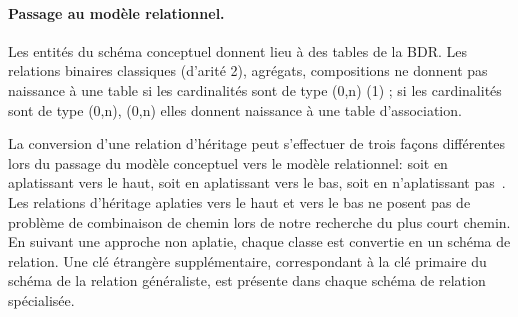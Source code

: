 \paragraph*{Passage au modèle relationnel.}
Les entités du schéma conceptuel donnent lieu à des tables de la BDR.
Les relations binaires classiques (d'arité 2), agrégats, compositions ne donnent pas naissance à une table si les cardinalités sont de type (0,n) (1) ; si les cardinalités sont de type (0,n), (0,n) elles donnent naissance à une table d'association.

La conversion d'une relation d'héritage peut s'effectuer de trois façons différentes lors du passage du modèle conceptuel vers le modèle relationnel: soit en aplatissant vers le haut, soit en aplatissant vers le bas, soit en n'aplatissant pas~\cite{elmasri_2006}. Les relations d'héritage aplaties vers le haut et vers le bas ne posent pas de problème de combinaison de chemin lors de notre recherche du plus court chemin. En suivant une approche non aplatie, chaque classe est convertie en un schéma de relation.  Une clé étrangère supplémentaire, correspondant à la clé primaire du schéma de la relation généraliste, est présente dans chaque schéma de relation spécialisée. 


%

